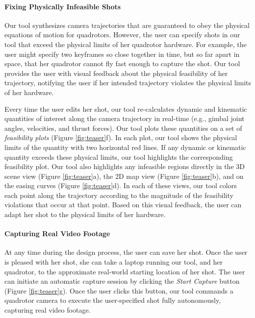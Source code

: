 
\paragraph{Fixing Physically Infeasible Shots}

Our tool synthesizes camera trajectories that are guaranteed to obey the physical equations of motion for quadrotors. However, the user can specify shots in our tool that exceed the physical limits of her quadrotor hardware.
For example, the user might specify two keyframes so close together in time, but so far apart in space, that her quadrotor cannot fly fast enough to capture the shot.
Our tool provides the user with visual feedback about the physical feasibility of her trajectory, notifying the user if her intended trajectory violates the physical limits of her  hardware.

Every time the user edits her shot, our tool re-calculates dynamic and kinematic quantities of interest along the camera trajectory in real-time (e.g., gimbal joint angles, velocities, and thrust forces).
Our tool plots these quantities on a set of \emph{feasibility plots} (Figure \ref{fig:teaser}f).
In each plot, our tool shows the physical limits of the quantity with two horizontal red lines.
If any dynamic or kinematic quantity exceeds these physical limits, our tool highlights the corresponding feasibility plot.
Our tool also highlights any infeasible regions directly in the 3D scene view (Figure \ref{fig:teaser}a), the 2D map view (Figure \ref{fig:teaser}b), and on the easing curves (Figure \ref{fig:teaser}d).
In each of these views, our tool colors each point along the trajectory according to the magnitude of the feasibility violations that occur at that point.
Based on this visual feedback, the user can adapt her shot to the physical limits of her hardware.

\paragraph{Capturing Real Video Footage}

At any time during the design process, the user can save her shot.
Once the user is pleased with her shot, she can take a laptop running our tool, and her quadrotor, to the approximate real-world starting location of her shot.
The user can initiate an automatic capture session by clicking the \emph{Start Capture} button (Figure \ref{fig:teaser}g).
Once the user clicks this button, our tool commands a quadrotor camera to execute the user-specified shot fully autonomously, capturing real video footage.
